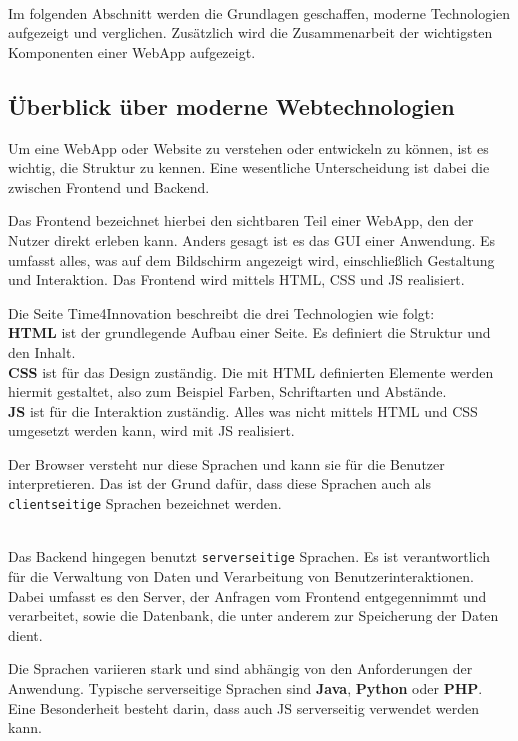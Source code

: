 \documentclass[biblatex]{lni}
\begin{document}
\\

Im folgenden Abschnitt werden die Grundlagen geschaffen,
moderne Technologien aufgezeigt und verglichen.
Zusätzlich wird die Zusammenarbeit der wichtigsten Komponenten einer \ac{WebApp} aufgezeigt.

\subsection{Überblick über moderne Webtechnologien}
\label{sec:moderne-webtechnologien}

Um eine \ac{WebApp} oder Website zu verstehen oder entwickeln zu können, ist es wichtig, die Struktur zu kennen.
Eine wesentliche Unterscheidung ist dabei die zwischen Frontend und Backend.

Das Frontend bezeichnet hierbei den sichtbaren Teil einer \ac{WebApp}, den der Nutzer direkt erleben kann. \cite{CMSRev}
Anders gesagt ist es das \ac{GUI} einer Anwendung.
Es umfasst alles, was auf dem Bildschirm angezeigt wird, einschließlich Gestaltung und Interaktion.
Das Frontend wird mittels \ac{HTML}, \ac{CSS} und \ac{JS} realisiert.

Die Seite Time4Innovation \cite{T4I} beschreibt die drei Technologien wie folgt: \\
\textbf{\ac{HTML}} ist der grundlegende Aufbau einer Seite.
Es definiert die Struktur und den Inhalt. \\
\textbf{\ac{CSS}} ist für das Design zuständig.
Die mit \ac{HTML} definierten Elemente werden hiermit gestaltet, also zum Beispiel Farben, Schriftarten und Abstände. \\
\textbf{\ac{JS}} ist für die Interaktion zuständig.
Alles was nicht mittels \ac{HTML} und \ac{CSS} umgesetzt werden kann, wird mit \ac{JS} realisiert.

Der Browser versteht nur diese Sprachen und kann sie für die Benutzer interpretieren. \cite{CoU}
Das ist der Grund dafür, dass diese Sprachen auch als \texttt{clientseitige} Sprachen bezeichnet werden.

\\

Das Backend hingegen benutzt \texttt{serverseitige} Sprachen. \cite{CMSRev}
Es ist verantwortlich für die Verwaltung von Daten und Verarbeitung von Benutzerinteraktionen.
Dabei umfasst es den Server, der Anfragen vom Frontend entgegennimmt und verarbeitet,
sowie die Datenbank, die unter anderem zur Speicherung der Daten dient.

Die Sprachen variieren stark und sind abhängig von den Anforderungen der Anwendung.
Typische serverseitige Sprachen sind \textbf{Java}, \textbf{Python} oder \textbf{PHP}.
Eine Besonderheit besteht darin, dass auch \ac{JS} serverseitig verwendet werden kann.
\end{document}
